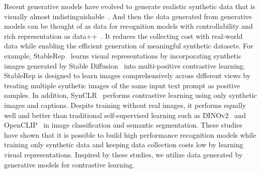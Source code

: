 Recent generative models have evolved to generate realistic synthetic data that is visually almost indistinguishable~\cite{rombach2022high, saharia2022photorealistic, nichol2021glide}. And then the data generated from generative models can be thought of as data for recognition models with controllability and rich representation as data++~\cite{isola2022when, sariyildiz2023fake}. It reduces the collecting cost with real-world data while enabling the efficient generation of meaningful synthetic datasets. For example, StableRep~\cite{tian2024stablerep} learns visual representations by incorporating synthetic images generated by Stable Diffusion~\cite{rombach2022high} into multi-positive contrastive learning.  
StableRep is designed to learn images comprehensively across different views by treating multiple synthetic images of the same input text prompt as positive samples. 
In addition, SynCLR~\cite{tian2024learning} performs contrastive learning using only synthetic images and captions.
Despite training without real images, it performs equally well and better than traditional self-supervised learning such as DINOv2~\cite{oquab2023dinov2} and OpenCLIP~\cite{cherti2023reproducible} in image classification and semantic segmentation. These studies have shown that it is possible to build high performance recognition models while training only synthetic data and keeping data collection costs low by learning visual representations.
Inspired by these studies, we utilize data generated by generative models for contrastive learning.
